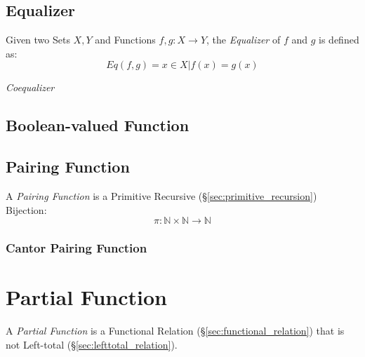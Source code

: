 \subsection{Equalizer}\label{sec:function_equalizer}

Given two Sets $X,Y$ and Functions $f,g : X \rightarrow Y$, the
\emph{Equalizer} of $f$ and $g$ is defined as:
\[
  Eq(f,g) = { x \in X | f(x) = g(x) }
\]

\emph{Coequalizer}



\subsection{Boolean-valued Function}\label{sec:boolean_function}

\subsection{Pairing Function}\label{sec:pairing_function}

A \emph{Pairing Function} is a Primitive Recursive
(\S\ref{sec:primitive_recursion}) Bijection:
\[
  \pi : \mathbb{N} \times \mathbb{N} \rightarrow \mathbb{N}
\]



\subsubsection{Cantor Pairing Function}\label{sec:cantor_pairing}



\section{Partial Function}\label{sec:partial_function}

A \emph{Partial Function} is a Functional Relation
(\S\ref{sec:functional_relation}) that is not Left-total
(\S\ref{sec:lefttotal_relation}).




